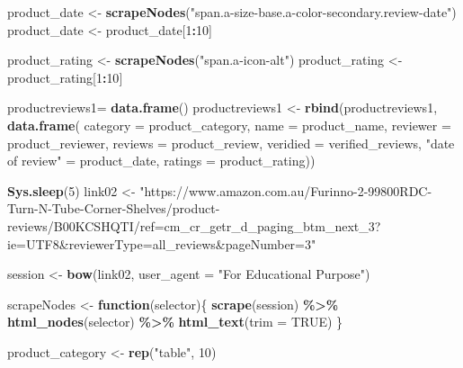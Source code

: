 \documentclass[
]{article}
\newenvironment{Shaded}{\begin{snugshade}}{\end{snugshade}}
\newcommand{\AttributeTok}[1]{\textcolor[rgb]{0.13,0.29,0.53}{#1}}
\newcommand{\ConstantTok}[1]{\textcolor[rgb]{0.56,0.35,0.01}{#1}}
\newcommand{\ControlFlowTok}[1]{\textcolor[rgb]{0.13,0.29,0.53}{\textbf{#1}}}
\newcommand{\DecValTok}[1]{\textcolor[rgb]{0.00,0.00,0.81}{#1}}
\newcommand{\FunctionTok}[1]{\textcolor[rgb]{0.13,0.29,0.53}{\textbf{#1}}}
\newcommand{\NormalTok}[1]{#1}
\newcommand{\OtherTok}[1]{\textcolor[rgb]{0.56,0.35,0.01}{#1}}
\newcommand{\SpecialCharTok}[1]{\textcolor[rgb]{0.81,0.36,0.00}{\textbf{#1}}}
\newcommand{\StringTok}[1]{\textcolor[rgb]{0.31,0.60,0.02}{#1}}
\begin{document}
\begin{Shaded}
\begin{Highlighting}[]
\NormalTok{  product\_date }\OtherTok{\textless{}{-}} \FunctionTok{scrapeNodes}\NormalTok{(}\StringTok{"span.a{-}size{-}base.a{-}color{-}secondary.review{-}date"}\NormalTok{)}
\NormalTok{  product\_date }\OtherTok{\textless{}{-}}\NormalTok{ product\_date[}\DecValTok{1}\SpecialCharTok{:}\DecValTok{10}\NormalTok{]}
  
\NormalTok{  product\_rating }\OtherTok{\textless{}{-}} \FunctionTok{scrapeNodes}\NormalTok{(}\StringTok{"span.a{-}icon{-}alt"}\NormalTok{)}
\NormalTok{  product\_rating }\OtherTok{\textless{}{-}}\NormalTok{ product\_rating[}\DecValTok{1}\SpecialCharTok{:}\DecValTok{10}\NormalTok{]}
  
\NormalTok{  productreviews1}\OtherTok{=} \FunctionTok{data.frame}\NormalTok{()}
\NormalTok{  productreviews1 }\OtherTok{\textless{}{-}} \FunctionTok{rbind}\NormalTok{(productreviews1, }\FunctionTok{data.frame}\NormalTok{(}
                      \AttributeTok{category =}\NormalTok{ product\_category,}
                      \AttributeTok{name =}\NormalTok{ product\_name,}
                      \AttributeTok{reviewer =}\NormalTok{ product\_reviewer,}
                      \AttributeTok{reviews =}\NormalTok{ product\_review,}
                      \AttributeTok{veridied =}\NormalTok{ verified\_reviews,}
                      \StringTok{"date of review"} \OtherTok{=}\NormalTok{ product\_date,}
                      \AttributeTok{ratings =}\NormalTok{ product\_rating))}

  
 \FunctionTok{Sys.sleep}\NormalTok{(}\DecValTok{5}\NormalTok{)}
\NormalTok{link02 }\OtherTok{\textless{}{-}} \StringTok{"https://www.amazon.com.au/Furinno{-}2{-}99800RDC{-}Turn{-}N{-}Tube{-}Corner{-}Shelves/product{-}reviews/B00KCSHQTI/ref=cm\_cr\_getr\_d\_paging\_btm\_next\_3?ie=UTF8\&reviewerType=all\_reviews\&pageNumber=3"}


\NormalTok{  session }\OtherTok{\textless{}{-}} \FunctionTok{bow}\NormalTok{(link02,}
               \AttributeTok{user\_agent =} \StringTok{"For Educational Purpose"}\NormalTok{)}

\NormalTok{  scrapeNodes }\OtherTok{\textless{}{-}} \ControlFlowTok{function}\NormalTok{(selector)\{}
    \FunctionTok{scrape}\NormalTok{(session) }\SpecialCharTok{\%\textgreater{}\%}
      \FunctionTok{html\_nodes}\NormalTok{(selector) }\SpecialCharTok{\%\textgreater{}\%}
      \FunctionTok{html\_text}\NormalTok{(}\AttributeTok{trim =} \ConstantTok{TRUE}\NormalTok{)}
\NormalTok{  \}}

\NormalTok{  product\_category }\OtherTok{\textless{}{-}} \FunctionTok{rep}\NormalTok{(}\StringTok{"table"}\NormalTok{, }\DecValTok{10}\NormalTok{)}


\end{Highlighting}
\end{Shaded}
\end{document}
